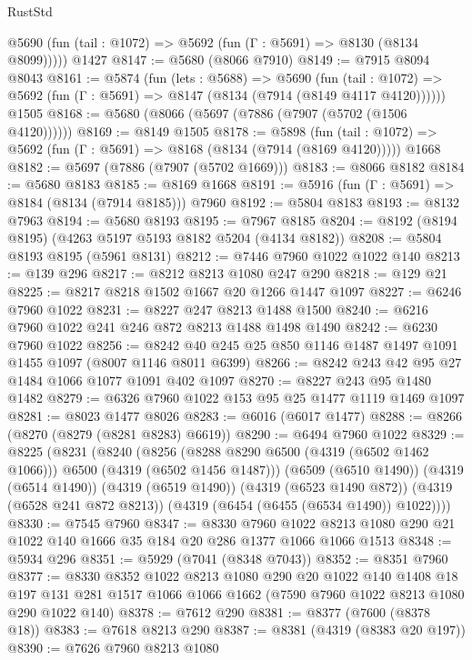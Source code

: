\begin{lexlean}{RustStd}
\begin{coremodule}
      @5690 (fun (tail : @1072) => @5692 (fun (Γ : @5691) => @8130 (@8134 @8099)))))
    @1427
@8147 := @5680 (@8066 @7910)
@8149 := @7915 @8094 @8043
@8161 := @5874
    (fun (lets : @5688) =>
    @5690
      (fun (tail : @1072) => @5692 (fun (Γ : @5691) => @8147 (@8134 (@7914 (@8149 @4117 @4120))))))
    @1505
@8168 := @5680 (@8066 (@5697 (@7886 (@7907 (@5702 (@1506 @4120))))))
@8169 := @8149 @1505
@8178 := @5898
    (fun (tail : @1072) => @5692 (fun (Γ : @5691) => @8168 (@8134 (@7914 (@8169 @4120)))))
    @1668
@8182 := @5697 (@7886 (@7907 (@5702 @1669)))
@8183 := @8066 @8182
@8184 := @5680 @8183
@8185 := @8169 @1668
@8191 := @5916 (fun (Γ : @5691) => @8184 (@8134 (@7914 @8185))) @7960
@8192 := @5804 @8183
@8193 := @8132 @7963
@8194 := @5680 @8193
@8195 := @7967 @8185
@8204 := @8192 (@8194 @8195) (@4263 @5197 @5193 @8182 @5204 (@4134 @8182))
@8208 := @5804 @8193 @8195 (@5961 @8131)
@8212 := @7446 @7960 @1022 @1022 @140
@8213 := @139 @296
@8217 := @8212 @8213 @1080 @247 @290
@8218 := @129 @21
@8225 := @8217 @8218 @1502 @1667 @20 @1266 @1447 @1097
@8227 := @6246 @7960 @1022
@8231 := @8227 @247 @8213 @1488 @1500
@8240 := @6216 @7960 @1022 @241 @246 @872 @8213 @1488 @1498 @1490
@8242 := @6230 @7960 @1022
@8256 := @8242 @40 @245 @25 @850 @1146 @1487 @1497 @1091 @1455 @1097 (@8007 @1146 @8011 @6399)
@8266 := @8242 @243 @42 @95 @27 @1484 @1066 @1077 @1091 @402 @1097
@8270 := @8227 @243 @95 @1480 @1482
@8279 := @6326 @7960 @1022 @153 @95 @25 @1477 @1119 @1469 @1097
@8281 := @8023 @1477 @8026
@8283 := @6016 (@6017 @1477)
@8288 := @8266 (@8270 (@8279 (@8281 @8283) @6619))
@8290 := @6494 @7960 @1022
@8329 := @8225
    (@8231
      (@8240
        (@8256 (@8288 @8290 @6500 (@4319 (@6502 @1462 @1066))) @6500 (@4319 (@6502 @1456 @1487)))
        (@6509 (@6510 @1490))
        (@4319 (@6514 @1490))
        (@4319 (@6519 @1490))
        (@4319 (@6523 @1490 @872))
        (@4319 (@6528 @241 @872 @8213))
        (@4319 (@6454 (@6455 (@6534 @1490)) @1022))))
@8330 := @7545 @7960
@8347 := @8330
    @7960
    @1022
    @8213
    @1080
    @290
    @21
    @1022
    @140
    @1666
    @35
    @184
    @20
    @286
    @1377
    @1066
    @1066
    @1513
@8348 := @5934 @296
@8351 := @5929 (@7041 (@8348 @7043))
@8352 := @8351 @7960
@8377 := @8330
    @8352
    @1022
    @8213
    @1080
    @290
    @20
    @1022
    @140
    @1408
    @18
    @197
    @131
    @281
    @1517
    @1066
    @1066
    @1662
    (@7590 @7960 @1022 @8213 @1080 @290 @1022 @140)
@8378 := @7612 @290
@8381 := @8377 (@7600 (@8378 @18))
@8383 := @7618 @8213 @290
@8387 := @8381 (@4319 (@8383 @20 @197))
@8390 := @7626 @7960 @8213 @1080

\end{coremodule}
\end{lexlean}

